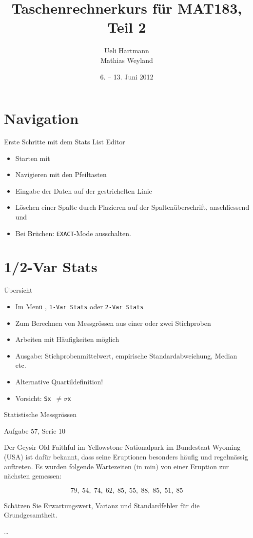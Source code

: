 \documentclass[handout]{beamer}
\title{Taschenrechnerkurs für MAT183, Teil 2}
\author{Ueli Hartmann\\Mathias Weyland}
\date{6. -- 13. Juni 2012}
\newlength{\tikey}
\newcommand{\keystroke}[1]{\settowidth{\tikey}{\scriptsize #1}\psframebox[framearc=0.2]{\parbox{\tikey}{\scriptsize #1}}}
\begin{document}
\frame{\maketitle}


\section{Navigation}
\begin{frame}{Erste Schritte mit dem Stats List Editor}
\begin{itemize}
\item Starten mit \keystroke{APPS}
\item Navigieren mit den Pfeiltasten
\item Eingabe der Daten auf der gestrichelten Linie
\item Löschen einer Spalte durch Plazieren auf der Spaltenüberschrift, anschliessend \keystroke{CLEAR} und \keystroke{ENTER}
\item Bei Brüchen: \texttt{EXACT}-Mode ausschalten.
\end{itemize}
\end{frame}

\section{1/2-Var Stats}
\begin{frame}{Übersicht}
\begin{itemize}
\item Im Menü \keystroke{F4}, \texttt{1-Var Stats} oder \texttt{2-Var Stats}
\item Zum Berechnen von Messgrössen aus einer oder zwei Stichproben
\item Arbeiten mit Häufigkeiten möglich
\item Ausgabe: Stichprobenmittelwert, empirische Standardabweichung, Median etc.
\item Alternative Quartildefinition!
\item Vorsicht: \texttt{Sx $\ne\sigma$x}
\end{itemize}
\end{frame}

\begin{frame}{Statistische Messgrössen}
\begin{beamerboxesrounded}[shadow]{Aufgabe 57, Serie 10}

Der Geysir Old Faithful im Yellowstone-Nationalpark im Bundestaat Wyoming (USA)
ist dafür bekannt, dass seine Eruptionen besonders häufig und regelmässig
auftreten. Es wurden folgende Wartezeiten (in min) von einer Eruption zur
nächsten gemessen:

$$
79,\; 54,\; 74,\; 62,\; 85,\; 55,\; 88,\; 85,\; 51,\; 85
$$

\begin{outline}
\item Schätzen Sie Erwartungswert, Varianz und Standardfehler für die Grundgesamtheit.
\item \dots
\end{outline}
\end{beamerboxesrounded}
\end{frame}
\end{document}
